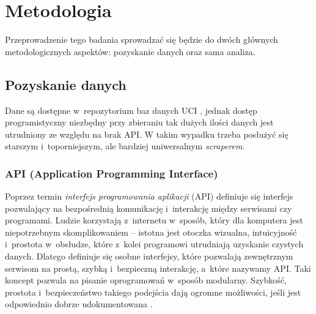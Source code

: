 \chapter{Metodologia}

Przeprowadzenie tego badania sprowadzać się będzie do dwóch głównych metodologicznych aspektów: pozyskanie danych oraz sama analiza.

\section{Pozyskanie danych}

Dane są dostępne w~repozytorium baz danych UCI \cite{Dua:2021}, jednak dostęp programistyczny niezbędny przy zbieraniu tak dużych ilości danych jest utrudniony ze względu na brak API.
W takim wypadku trzeba posłużyć się starszym i~toporniejszym, ale bardziej uniwersalnym \emph{scraperem}.

\subsection{API (Application Programming Interface)}

Poprzez termin \emph{interfejs programowania aplikacji} (API) definiuje się interfejs pozwalający na bezpośrednią komunikację i~interakcję między serwisami czy programami.
Ludzie korzystają z~internetu w~sposób, który dla komputera jest niepotrzebnym skomplikowaniem -- istotna jest otoczka wizualna, intuicyjność i~prostota w~obsłudze, które z~kolei programowi utrudniają uzyskanie czystych danych.
Dlatego definiuje się osobne interfejsy, które pozwalają zewnętrznym serwisom na prostą, szybką i~bezpieczną interakcję, a~które nazywamy API.
Taki koncept pozwala na pisanie oprogramowań w~sposób modularny.
Szybkość, prostota i~bezpieczeństwo takiego podejścia dają ogromne możliwości, jeśli jest odpowiednio dobrze udokumentowana \cite{meng2018application}.

